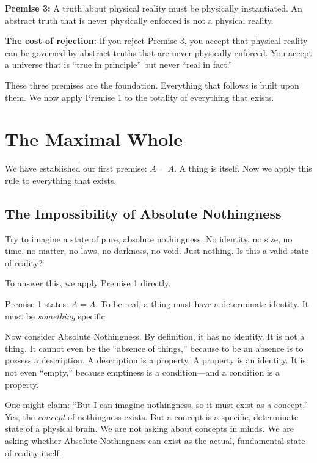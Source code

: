 \documentclass[11pt]{article}
\theoremstyle{canonstyle}
\begin{document}
\begin{keyresult}
\textbf{Premise 3:} A truth about physical reality must be physically instantiated. An abstract truth that is never physically enforced is not a physical reality.
\end{keyresult}

\textbf{The cost of rejection:} If you reject Premise 3, you accept that physical reality can be governed by abstract truths that are never physically enforced. You accept a universe that is ``true in principle'' but never ``real in fact.'' 

These three premises are the foundation. Everything that follows is built upon them. We now apply Premise 1 to the totality of everything that exists.

\newpage

\section{The Maximal Whole}

We have established our first premise: $A=A$. A thing is itself. Now we apply this rule to everything that exists.

\subsection{The Impossibility of Absolute Nothingness}

\begin{reflect}
Try to imagine a state of pure, absolute nothingness. No identity, no size, no time, no matter, no laws, no darkness, no void. Just nothing. Is this a valid state of reality?
\end{reflect}

To answer this, we apply Premise 1 directly. 

Premise 1 states: $A = A$. To be real, a thing must have a determinate identity. It must be \emph{something} specific. 

Now consider Absolute Nothingness. By definition, it has no identity. It is not a thing. It cannot even be the ``absence of things,'' because to be an absence is to possess a description. A description is a property. A property is an identity. It is not even ``empty,'' because emptiness is a condition---and a condition is a property.

One might claim: ``But I can imagine nothingness, so it must exist as a concept.'' Yes, the \emph{concept} of nothingness exists. But a concept is a specific, determinate state of a physical brain. We are not asking about concepts in minds. We are asking whether Absolute Nothingness can exist as the actual, fundamental state of reality itself. 
\end{document}
